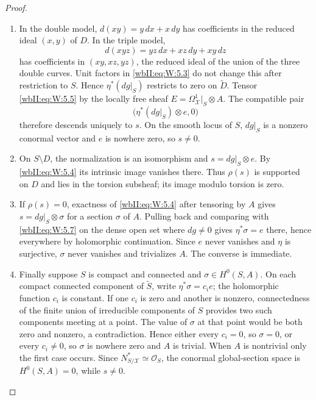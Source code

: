 \begin{proof}

\begin{enumerate}[label={$\langle1\rangle$\arabic*.},leftmargin=*]
\item In the double model, $d(xy)=y\,dx+x\,dy$ has coefficients in the reduced
ideal $(x,y)$ of $D$.  In the triple model,
\[
d(xyz)=yz\,dx+xz\,dy+xy\,dz
\]
has coefficients in $(xy,xz,yz)$, the reduced ideal of the union of the
three double curves.  Unit factors in \eqref{wbII:eq:W:5.3} do not change this after
restriction to $S$.  Hence $\eta^*(dg|_S)$ restricts to zero on
$\widetilde D$.  Tensor \eqref{wbII:eq:W:5.5} by the locally free sheaf
$E=\Omega^1_{\mathcal X}|_S\otimes A$.  The compatible pair
\[
\bigl(\eta^*(dg|_S)\otimes e,0\bigr)
\]
therefore descends uniquely to $s$.  On the smooth locus of $S$, $dg|_S$
is a nonzero conormal vector and $e$ is nowhere zero, so $s\ne0$.

\item On $S\setminus D$, the normalization is an isomorphism and
$s=dg|_S\otimes e$.  By \eqref{wbII:eq:W:5.4} its intrinsic image vanishes there.  Thus
$\rho(s)$ is supported on $D$ and lies in the torsion subsheaf; its image
modulo torsion is zero.

\item If $\rho(s)=0$, exactness of \eqref{wbII:eq:W:5.4} after tensoring by $A$ gives
$s=dg|_S\otimes\sigma$ for a section $\sigma$ of $A$.  Pulling back and
comparing with \eqref{wbII:eq:W:5.7} on the dense open set where $dg\ne0$ gives
$\eta^*\sigma=e$ there, hence everywhere by holomorphic continuation.
Since $e$ never vanishes and $\eta$ is surjective, $\sigma$ never vanishes
and trivializes $A$.  The converse is immediate.

\item Finally suppose $S$ is compact and connected and $\sigma\in H^0(S,A)$.  On each compact
connected component of $\widetilde S$, write
$\eta^*\sigma=c_i e$; the holomorphic function $c_i$ is constant.  If one
$c_i$ is zero and another is nonzero, connectedness of the finite union of
irreducible components of $S$ provides two such components meeting at a
point.  The value of $\sigma$ at that point would be both zero and nonzero,
a contradiction.  Hence either every $c_i=0$, so $\sigma=0$, or every
$c_i\ne0$, so $\sigma$ is nowhere zero and $A$ is trivial.  When $A$ is
nontrivial only the first case occurs.  Since
$N^*_{S/\mathcal X}\simeq\mathcal O_S$, the conormal global-section space is
$H^0(S,A)=0$, while $s\ne0$.

\end{enumerate}
\end{proof}